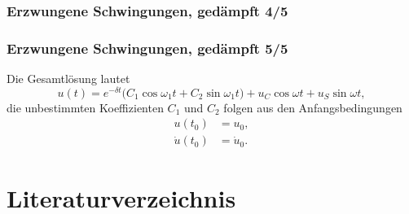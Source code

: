 \documentclass[hyperref={pdfpagemode=FullScreen, colorlinks=false}]{beamer}
\begin{document}
\begin{frame}
\frametitle{Erzwungene Schwingungen, {\normalsize gedämpft 4/5}}




\end{frame}

\begin{frame}
\frametitle{Erzwungene Schwingungen, {\normalsize gedämpft 5/5}}
Die Gesamtlösung lautet
\begin{equation*}
 u(t)=e^{-\delta t}\bigl( C_1\cos\omega_1 t + C_2\sin\omega_1 t \bigr)
 +u_C\cos\omega t + u_S\sin\omega t,
\end{equation*}
die unbestimmten Koeffizienten $C_1$ und $C_2$ folgen aus den Anfangsbedingungen
\begin{align*}
 u(t_0)&=u_0,\\
 \dot{u}(t_0)&=\dot{u}_0.
\end{align*}
\end{frame}


\section*{Literaturverzeichnis}

\begin{frame}[allowframebreaks]{}
	\printbibliography
\end{frame}
\end{document}
